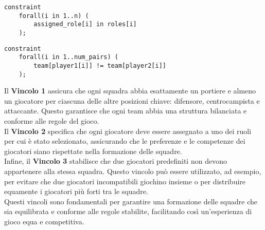 \documentclass{article}
\begin{document}
\begin{multicols*}{2}
\begin{lstlisting}[style=minizinc, caption={Vincolo 2 Minizinc}, label={lst:minizinc_vincolo2}]
% Ogni giocatore deve essere assegnato a uno dei suoi ruoli scelti
constraint
    forall(i in 1..n) (
        assigned_role[i] in roles[i]
    );
\end{lstlisting}

\begin{lstlisting}[style=minizinc, caption={Vincolo 3 Minizinc}, label={lst:minizinc_vincolo3}]
    constraint
    forall(i in 1..num_pairs) (
        team[player1[i]] != team[player2[i]]
    );
\end{lstlisting}
Il \textbf{Vincolo 1} assicura che ogni squadra abbia esattamente un portiere e almeno un giocatore per ciascuna delle altre posizioni chiave: difensore, centrocampista e attaccante. Questo garantisce che ogni team abbia una struttura bilanciata e conforme alle regole del gioco.
\\
Il \textbf{Vincolo 2} specifica che ogni giocatore deve essere assegnato a uno dei ruoli per cui è stato selezionato, assicurando che le preferenze e le competenze dei giocatori siano rispettate nella formazione delle squadre.
\\
Infine, il \textbf{Vincolo 3} stabilisce che due giocatori predefiniti non devono appartenere alla stessa squadra. Questo vincolo può essere utilizzato, ad esempio, per evitare che due giocatori incompatibili giochino insieme o per distribuire equamente i giocatori più forti tra le squadre.
\\
Questi vincoli sono fondamentali per garantire una formazione delle squadre che sia equilibrata e conforme alle regole stabilite, facilitando così un'esperienza di gioco equa e competitiva.
\end{multicols*}
\end{document}
